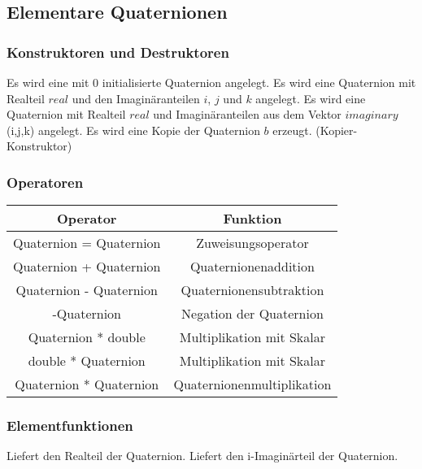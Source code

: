 \hypertarget{Trafo}{}

\subsection{Elementare Quaternionen}
\hypertarget{Quaternion}{}

\subsubsection{Konstruktoren und Destruktoren}
\descr
    {
      Es wird eine mit 0 initialisierte Quaternion angelegt.
    }
    \descr
	{
	  Es wird eine Quaternion mit Realteil $real$ und den
	  Imaginäranteilen $i$, $j$ und $k$ angelegt.
	}
	\descr
	    {
	      Es wird eine Quaternion mit Realteil $real$ und
	      Imaginäranteilen aus dem Vektor $imaginary$ (i,j,k) angelegt.
	    }
	         {
	           Es wird eine Kopie der Quaternion $b$ erzeugt. (Kopier-Konstruktor)	
	         }
	         \subsubsection{Operatoren}
	         \begin{tabular}{|c|c|}
		   \hline
		   Operator & Funktion\\ 
		   \hline
		   Quaternion = Quaternion & Zuweisungsoperator\\
		   \hline
		   Quaternion + Quaternion & Quaternionenaddition\\
		   \hline
		   Quaternion - Quaternion & Quaternionensubtraktion\\
		   \hline
			-Quaternion & Negation der Quaternion\\
			\hline
			Quaternion * double & Multiplikation mit Skalar\\
			\hline
			double * Quaternion & Multiplikation mit Skalar\\
			\hline
			Quaternion * Quaternion & Quaternionenmultiplikation\\
			\hline
		 \end{tabular}
		 
	         \subsubsection{Elementfunktionen}
		 \descr
		     {
			Liefert den Realteil der Quaternion.
		}
		\descr
		{
			Liefert den i-Imaginärteil der Quaternion.
		}
		
